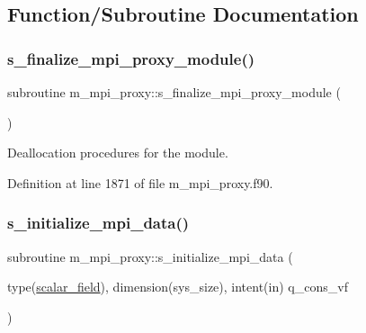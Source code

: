 \subsection{Function/\+Subroutine Documentation}
\mbox{\label{namespacem__mpi__proxy_ac984c84fe4140876d6600250af9807da}} 
\subsubsection{\texorpdfstring{s\+\_\+finalize\+\_\+mpi\+\_\+proxy\+\_\+module()}{s\_finalize\_mpi\_proxy\_module()}}
{\footnotesize\ttfamily subroutine m\+\_\+mpi\+\_\+proxy\+::s\+\_\+finalize\+\_\+mpi\+\_\+proxy\+\_\+module (\begin{DoxyParamCaption}{ }\end{DoxyParamCaption})}



Deallocation procedures for the module. 



Definition at line 1871 of file m\+\_\+mpi\+\_\+proxy.\+f90.

\mbox{\label{namespacem__mpi__proxy_a2ff35ede51e90c483969e44c31303415}} 
\subsubsection{\texorpdfstring{s\+\_\+initialize\+\_\+mpi\+\_\+data()}{s\_initialize\_mpi\_data()}}
{\footnotesize\ttfamily subroutine m\+\_\+mpi\+\_\+proxy\+::s\+\_\+initialize\+\_\+mpi\+\_\+data (\begin{DoxyParamCaption}\item[{type(\hyperlink{structm__derived__types_1_1scalar__field}{scalar\+\_\+field}), dimension(sys\+\_\+size), intent(in)}]{q\+\_\+cons\+\_\+vf }\end{DoxyParamCaption})}



